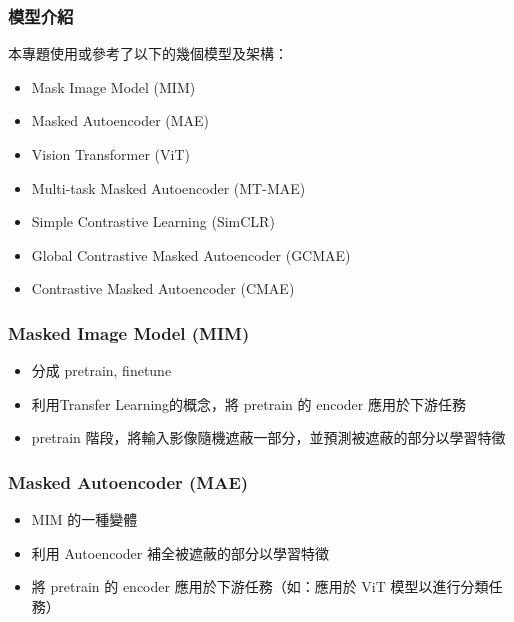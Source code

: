 \documentclass[xcolor=dvipsnames]{beamer}
\begin{document}
    \begin{frame}
        \frametitle{模型介紹}
        本專題使用或參考了以下的幾個模型及架構：
        \begin{itemize}
            \item Mask Image Model (MIM)
            \item Masked Autoencoder (MAE)
            \item Vision Transformer (ViT)
            \item Multi-task Masked Autoencoder (MT-MAE)
            \item Simple Contrastive Learning (SimCLR)
            \item Global Contrastive Masked Autoencoder (GCMAE)
            \item Contrastive Masked Autoencoder (CMAE)
        \end{itemize}
    \end{frame}

    \begin{frame}
        \frametitle{Masked Image Model (MIM)}
        \begin{itemize}
            \item 分成 pretrain, finetune
            \item 利用Transfer Learning的概念，將 pretrain 的 encoder 應用於下游任務
            \item pretrain 階段，將輸入影像隨機遮蔽一部分，並預測被遮蔽的部分以學習特徵
        \end{itemize}
    \end{frame}

    \begin{frame}
        \frametitle{Masked Autoencoder (MAE)}
        \begin{itemize}
            \item MIM 的一種變體
            \item 利用 Autoencoder 補全被遮蔽的部分以學習特徵
            \item 將 pretrain 的 encoder 應用於下游任務（如：應用於 ViT 模型以進行分類任務）
        \end{itemize}
    \end{frame}
\end{document}
